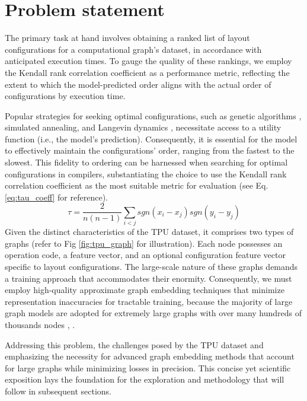 \documentclass{article}
\begin{document}
\section{Problem statement}
\label{sec:headings}

The primary task at hand involves obtaining a ranked list of layout configurations for a computational graph's dataset, in accordance with anticipated execution times. To gauge the quality of these rankings, we employ the Kendall rank correlation coefficient as a performance metric, reflecting the extent to which the model-predicted order aligns with the actual order of configurations by execution time.

Popular strategies for seeking optimal configurations, such as genetic algorithms \cite{taugtekin2021foga}, simulated annealing, and Langevin dynamics \cite{garriga2021exact}, necessitate access to a utility function (i.e., the model's prediction). Consequently, it is essential for the model to effectively maintain the configurations' order, ranging from the fastest to the slowest. This fidelity to ordering can be harnessed when searching for optimal configurations in compilers, substantiating the choice to use the Kendall rank correlation coefficient as the most suitable metric for evaluation (see Eq.\ref{eq:tau_coeff} for reference).
\begin{equation}
\label{eq:tau_coeff}
    \tau = \frac{2}{n(n-1)}\sum_{i < j} sgn(x_i - x_j) sgn(y_i - y_j)
\end{equation}
Given the distinct characteristics of the TPU dataset, it comprises two types of graphs (refer to Fig \ref{fig:tpu_graph} for illustration). Each node possesses an operation code, a feature vector, and an optional configuration feature vector specific to layout configurations. The large-scale nature of these graphs demands a training approach that accommodates their enormity. Consequently, we must employ high-quality approximate graph embedding techniques that minimize representation inaccuracies for tractable training, because the majority of large graph models are adopted for extremely large graphs with over many hundreds of thousands nodes \cite{lerer2019pytorch}, \cite{xu2018powerful}.

Addressing this problem, the challenges posed by the TPU dataset and emphasizing the necessity for advanced graph embedding methods that account for large graphs while minimizing losses in precision. This concise yet scientific exposition lays the foundation for the exploration and methodology that will follow in subsequent sections.
\end{document}
